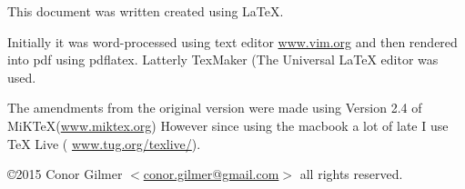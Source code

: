 \documentclass{article}
\begin{document}
This document was written created using \LaTeX{}. 

Initially it was word-processed using text editor \href{http://www.vim.org}{www.vim.org} and then rendered into pdf using pdflatex. Latterly TexMaker (The Universal LaTeX editor was used.

The amendments from the original version were made using Version 2.4 of MiKTeX(\href{http://www.miktex.org}{www.miktex.org})
However since using the macbook a lot of late I use \TeX{} Live ( \href{https://www.tug.org/texlive/}{www.tug.org/texlive/}).





\copyright 2015 Conor Gilmer $<$\href{mailto:conor.gilmer@gmail.com}{conor.gilmer@gmail.com}$>$ all rights reserved.
\end{document}
